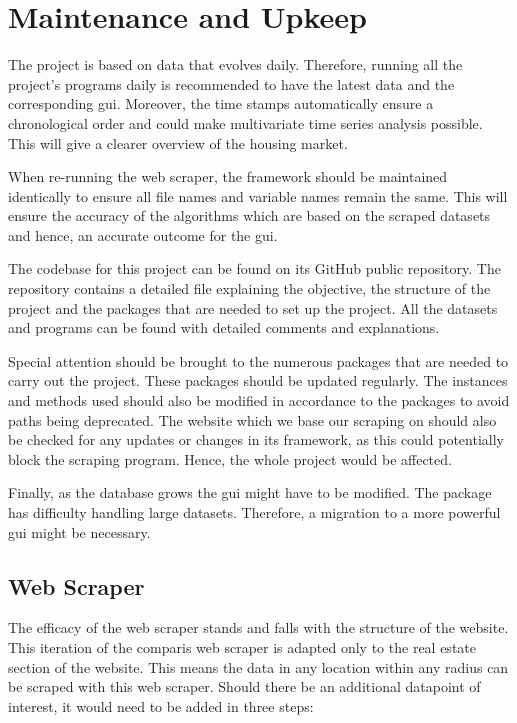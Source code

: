 \documentclass[main]{subfiles}
\begin{document}
\section{Maintenance and Upkeep}

The project is based on data that evolves daily. 
Therefore, running all the project's programs daily is recommended to have the latest data and the corresponding \ac{gui}. 
Moreover, the time stamps automatically ensure a chronological order and could make multivariate time series analysis possible.
This will give a clearer overview of the housing market. \par
When re-running the web scraper, the framework should be maintained identically to ensure all file names and variable names remain the same. 
This will ensure the accuracy of the algorithms which are based on the scraped datasets and hence, an accurate outcome for the \ac{gui}. \par
The codebase for this project can be found on its GitHub public repository. 
The repository contains a detailed \pkg[readme.md] file explaining the objective, 
the structure of the project and the packages that are needed to set up the project. 
All the datasets and programs can be found with detailed comments and explanations.\par
Special attention should be brought to the numerous packages that are needed to carry out the project. 
These packages should be updated regularly. 
The instances and methods used should also be modified in accordance to the packages to avoid paths being deprecated.
The website which we base our scraping on should also be checked for any updates or changes in its framework, 
as this could potentially block the scraping program. Hence, the whole project would be affected.\par
Finally, as the database grows the \ac{gui} might have to be modified. 
The \pkg[tkinter] package has difficulty handling large datasets.
Therefore, a migration to a more powerful \ac{gui} might be necessary.

\subsection{Web Scraper}
The efficacy of the web scraper stands and falls with the structure of the website.
This iteration of the comparis web scraper is adapted only to the real estate section of the website.
This means the data in any location within any radius can be scraped with this web scraper.
Should there be an additional datapoint of interest,
it would need to be added in three steps:
\end{document}
